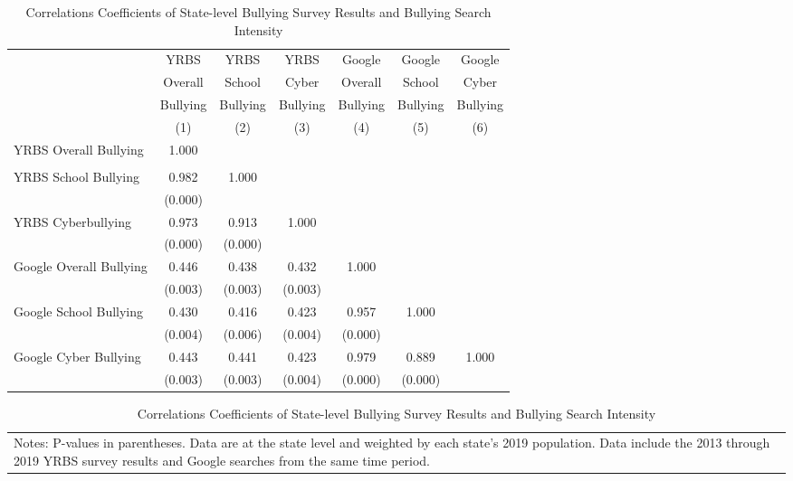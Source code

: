 \begin{table}[htbp] \centering
\def\sym#1{\ifmmode^{#1}\else\(^{#1}\)\fi}
\caption{Correlations Coefficients of State-level Bullying Survey Results and Bullying Search Intensity}
\label{t_correlation}
\begin{tabular*}{1\textwidth}{@{\extracolsep{\fill}}l*{6}{c}}
\midrule
&YRBS&YRBS&YRBS&Google&Google&Google\\
&Overall&School&Cyber&Overall&School&Cyber\\
&Bullying&Bullying&Bullying&Bullying&Bullying&Bullying\\
&(1)&(2)&(3)&(4)&(5)&(6)\\
\midrule
\midrule
YRBS Overall Bullying&       1.000&            &            &            &            &            \\
                    &            &            &            &            &            &            \\
\addlinespace
YRBS School Bullying&       0.982&       1.000&            &            &            &            \\
                    &     (0.000)&            &            &            &            &            \\
\addlinespace
YRBS Cyberbullying  &       0.973&       0.913&       1.000&            &            &            \\
                    &     (0.000)&     (0.000)&            &            &            &            \\
\addlinespace
Google Overall Bullying&       0.446&       0.438&       0.432&       1.000&            &            \\
                    &     (0.003)&     (0.003)&     (0.003)&            &            &            \\
\addlinespace
Google School Bullying&       0.430&       0.416&       0.423&       0.957&       1.000&            \\
                    &     (0.004)&     (0.006)&     (0.004)&     (0.000)&            &            \\
\addlinespace
Google Cyber Bullying&       0.443&       0.441&       0.423&       0.979&       0.889&       1.000\\
                    &     (0.003)&     (0.003)&     (0.004)&     (0.000)&     (0.000)&            \\
\midrule
\end{tabular*}
\begin{tabular*}{1\textwidth}{p{6.4in}}
\footnotesize{Notes: P-values in parentheses. Data are at the state level and weighted by each state's 2019 population. Data include the 2013 through 2019 YRBS survey results and Google searches from the same time period.}
\end{tabular*}
\end{table}
